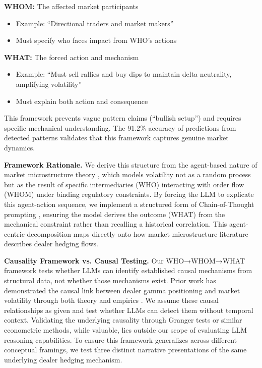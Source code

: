 \textbf{WHOM:} The affected market participants
\begin{itemize}
\item Example: ``Directional traders and market makers''
\item Must specify who faces impact from WHO's actions
\end{itemize}

\textbf{WHAT:} The forced action and mechanism
\begin{itemize}
\item Example: ``Must sell rallies and buy dips to maintain delta neutrality, amplifying volatility''
\item Must explain both action and consequence
\end{itemize}

This framework prevents vague pattern claims (``bullish setup'') and requires specific mechanical understanding. The 91.2\% accuracy of predictions from detected patterns validates that this framework captures genuine market dynamics.

\textbf{Framework Rationale.} We derive this structure from the agent-based nature of market microstructure theory \citep{grossman1988liquidity,garleanu2009demand}, which models volatility not as a random process but as the result of specific intermediaries (WHO) interacting with order flow (WHOM) under binding regulatory constraints. By forcing the LLM to explicate this agent-action sequence, we implement a structured form of Chain-of-Thought prompting \citep{wei2022chain}, ensuring the model derives the outcome (WHAT) from the mechanical constraint rather than recalling a historical correlation. This agent-centric decomposition maps directly onto how market microstructure literature describes dealer hedging flows.

\textbf{Causality Framework vs. Causal Testing.} Our WHO→WHOM→WHAT
framework tests whether LLMs can identify established causal mechanisms
from structural data, not whether those mechanisms exist. Prior work
has demonstrated the causal link between dealer gamma positioning and
market volatility through both theory \citep{frey1997market} and
empirics \citep{ni2022}. We assume these causal relationships as given
and test whether LLMs can detect them without temporal context.
Validating the underlying causality through Granger tests or similar
econometric methods, while valuable, lies outside our scope of
evaluating LLM reasoning capabilities.
To ensure this framework generalizes across different conceptual
framings, we test three distinct narrative presentations of the
same underlying dealer hedging mechanism.


